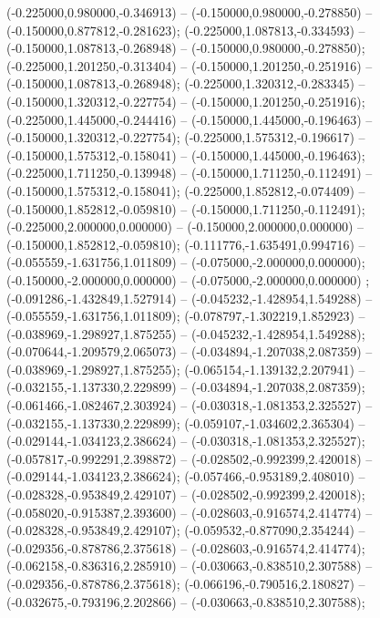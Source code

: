  (-0.225000,0.980000,-0.346913) -- (-0.150000,0.980000,-0.278850) -- (-0.150000,0.877812,-0.281623);
 (-0.225000,1.087813,-0.334593) -- (-0.150000,1.087813,-0.268948) -- (-0.150000,0.980000,-0.278850);
 (-0.225000,1.201250,-0.313404) -- (-0.150000,1.201250,-0.251916) -- (-0.150000,1.087813,-0.268948);
 (-0.225000,1.320312,-0.283345) -- (-0.150000,1.320312,-0.227754) -- (-0.150000,1.201250,-0.251916);
 (-0.225000,1.445000,-0.244416) -- (-0.150000,1.445000,-0.196463) -- (-0.150000,1.320312,-0.227754);
 (-0.225000,1.575312,-0.196617) -- (-0.150000,1.575312,-0.158041) -- (-0.150000,1.445000,-0.196463);
 (-0.225000,1.711250,-0.139948) -- (-0.150000,1.711250,-0.112491) -- (-0.150000,1.575312,-0.158041);
 (-0.225000,1.852812,-0.074409) -- (-0.150000,1.852812,-0.059810) -- (-0.150000,1.711250,-0.112491);
 (-0.225000,2.000000,0.000000) -- (-0.150000,2.000000,0.000000) -- (-0.150000,1.852812,-0.059810);
 (-0.111776,-1.635491,0.994716) -- (-0.055559,-1.631756,1.011809) -- (-0.075000,-2.000000,0.000000);
 (-0.150000,-2.000000,0.000000) -- (-0.075000,-2.000000,0.000000) ;
 (-0.091286,-1.432849,1.527914) -- (-0.045232,-1.428954,1.549288) -- (-0.055559,-1.631756,1.011809);
 (-0.078797,-1.302219,1.852923) -- (-0.038969,-1.298927,1.875255) -- (-0.045232,-1.428954,1.549288);
 (-0.070644,-1.209579,2.065073) -- (-0.034894,-1.207038,2.087359) -- (-0.038969,-1.298927,1.875255);
 (-0.065154,-1.139132,2.207941) -- (-0.032155,-1.137330,2.229899) -- (-0.034894,-1.207038,2.087359);
 (-0.061466,-1.082467,2.303924) -- (-0.030318,-1.081353,2.325527) -- (-0.032155,-1.137330,2.229899);
 (-0.059107,-1.034602,2.365304) -- (-0.029144,-1.034123,2.386624) -- (-0.030318,-1.081353,2.325527);
 (-0.057817,-0.992291,2.398872) -- (-0.028502,-0.992399,2.420018) -- (-0.029144,-1.034123,2.386624);
 (-0.057466,-0.953189,2.408010) -- (-0.028328,-0.953849,2.429107) -- (-0.028502,-0.992399,2.420018);
 (-0.058020,-0.915387,2.393600) -- (-0.028603,-0.916574,2.414774) -- (-0.028328,-0.953849,2.429107);
 (-0.059532,-0.877090,2.354244) -- (-0.029356,-0.878786,2.375618) -- (-0.028603,-0.916574,2.414774);
 (-0.062158,-0.836316,2.285910) -- (-0.030663,-0.838510,2.307588) -- (-0.029356,-0.878786,2.375618);
 (-0.066196,-0.790516,2.180827) -- (-0.032675,-0.793196,2.202866) -- (-0.030663,-0.838510,2.307588);
